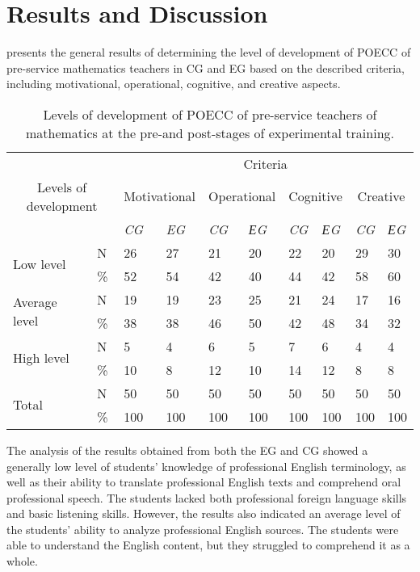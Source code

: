 \section{Results and Discussion}\label{sec-results}

 presents the general results of determining the level of
development of POECC of pre-service mathematics teachers in CG and EG
based on the described criteria, including motivational, operational,
cognitive, and creative aspects.

\begin{table}[!htpb]
\centering
\begin{threeparttable}
\caption{Levels of development of POECC of pre-service teachers of mathematics at the pre-and post-stages of experimental training.}
\label{tab-03}
\begin{tabular}{ l l l l l l l l l l}
\toprule		
 &  & \multicolumn{8}{c}{Criteria}\\
\multicolumn{2}{c}{Levels of development} & \multicolumn{2}{c}{Motivational} & \multicolumn{2}{c}{Operational} & \multicolumn{2}{c}{Cognitive} & \multicolumn{2}{c}{Creative} \\
 & & \emph{CG} & \emph{EG} & \emph{CG} & \emph{ЕG} & \emph{CG} & \emph{ЕG} & \emph{CG} & \emph{ЕG} \\
\midrule
\multirow{2}{*}{Low level} & N & 26 & 27 & 21 & 20 & 22 & 20 & 29 & 30 \\
 & \% & 52 & 54 & 42 & 40 & 44 & 42 & 58 & 60 \\
\cmidrule{2-10}
\multirow{2}{*}{Average level} & N & 19 & 19 & 23 & 25 & 21 & 24 & 17 & 16 \\
 & \% & 38 & 38 & 46 & 50 & 42 & 48 & 34 & 32 \\
\cmidrule{2-10}
\multirow{2}{*}{High level} & N & 5 & 4 & 6 & 5 & 7 & 6 & 4 & 4 \\
 & \% & 10 & 8 & 12 & 10 & 14 & 12 & 8 & 8 \\
\cmidrule{2-10}
\multirow{2}{*}{Total} & N & 50 & 50 & 50 & 50 & 50 & 50 & 50 & 50 \\
 & \% & 100 & 100 & 100 & 100 & 100 & 100 & 100 & 100  \\
\bottomrule
\end{tabular}
\end{threeparttable}
\end{table}

The analysis of the results obtained from both the EG and CG showed a
generally low level of students' knowledge of professional English
terminology, as well as their ability to translate professional English
texts and comprehend oral professional speech. The students lacked both
professional foreign language skills and basic listening skills.
However, the results also indicated an average level of the students'
ability to analyze professional English sources. The students were able
to understand the English content, but they struggled to comprehend it
as a whole.

